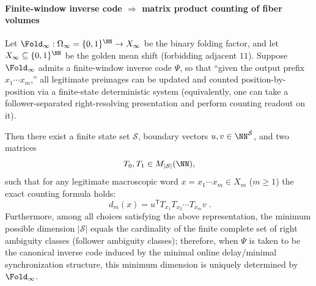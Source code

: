 \paragraph{Finite-window inverse code \texorpdfstring{$\Rightarrow$}{=>} matrix product counting of fiber volumes}
\begin{theorem}\label{thm:pom-fiber-multiplicity-matrix-product}
Let \(\Fold_\infty:\Omega_\infty=\{0,1\}^{\NN}\to X_\infty\) be the binary folding factor, and let \(X_\infty\subseteq\{0,1\}^{\NN}\) be the golden mean shift (forbidding adjacent \(11\)).
Suppose \(\Fold_\infty\) admits a finite-window inverse code \(\Psi\), so that ``given the output prefix \(x_1\cdots x_m\),'' all legitimate preimages can be updated and counted position-by-position via a finite-state deterministic system (equivalently, one can take a follower-separated right-resolving presentation and perform counting readout on it).

Then there exist a finite state set \(\mathcal S\), boundary vectors \(u,v\in\NN^{\mathcal S}\), and two matrices
\[
T_0,T_1\in M_{|\mathcal S|}(\NN),
\]
such that for any legitimate macroscopic word \(x=x_1\cdots x_m\in X_m\) (\(m\ge 1\)) the exact counting formula holds:
\[
\boxed{\;
d_m(x)=u^{\mathsf T}T_{x_1}T_{x_2}\cdots T_{x_m}v\; }.
\]
Furthermore, among all choices satisfying the above representation, the minimum possible dimension \(|\mathcal S|\) equals the cardinality of the finite complete set of right ambiguity classes (follower ambiguity classes);
therefore, when \(\Psi\) is taken to be the canonical inverse code induced by the minimal online delay/minimal synchronization structure, this minimum dimension is uniquely determined by \(\Fold_\infty\).
\end{theorem}

